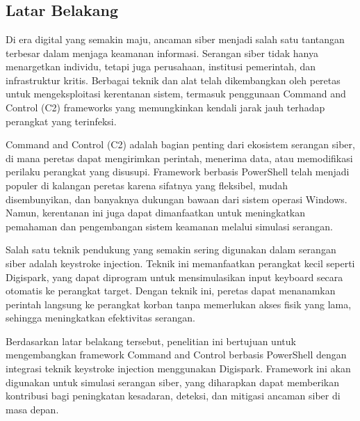 \chapter{\babSatu}



\section{Latar Belakang}

Di era digital yang semakin maju, ancaman siber menjadi salah satu tantangan terbesar dalam menjaga keamanan informasi. Serangan siber tidak hanya menargetkan individu, tetapi juga perusahaan, institusi pemerintah, dan infrastruktur kritis. Berbagai teknik dan alat telah dikembangkan oleh peretas untuk mengeksploitasi kerentanan sistem, termasuk penggunaan Command and Control (C2) frameworks yang memungkinkan kendali jarak jauh terhadap perangkat yang terinfeksi.

Command and Control (C2) adalah bagian penting dari ekosistem serangan siber, di mana peretas dapat mengirimkan perintah, menerima data, atau memodifikasi perilaku perangkat yang disusupi. Framework berbasis PowerShell telah menjadi populer di kalangan peretas karena sifatnya yang fleksibel, mudah disembunyikan, dan banyaknya dukungan bawaan dari sistem operasi Windows. Namun, kerentanan ini juga dapat dimanfaatkan untuk meningkatkan pemahaman dan pengembangan sistem keamanan melalui simulasi serangan.

Salah satu teknik pendukung yang semakin sering digunakan dalam serangan siber adalah keystroke injection. Teknik ini memanfaatkan perangkat kecil seperti Digispark, yang dapat diprogram untuk mensimulasikan input keyboard secara otomatis ke perangkat target. Dengan teknik ini, peretas dapat menanamkan perintah langsung ke perangkat korban tanpa memerlukan akses fisik yang lama, sehingga meningkatkan efektivitas serangan.

Berdasarkan latar belakang tersebut, penelitian ini bertujuan untuk mengembangkan framework Command and Control berbasis PowerShell dengan integrasi teknik keystroke injection menggunakan Digispark. Framework ini akan digunakan untuk simulasi serangan siber, yang diharapkan dapat memberikan kontribusi bagi peningkatan kesadaran, deteksi, dan mitigasi ancaman siber di masa depan.


